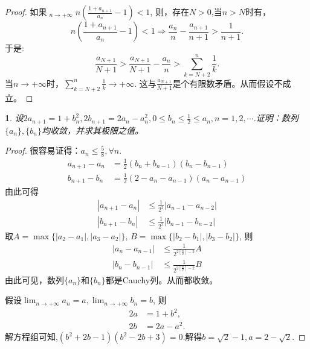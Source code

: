 \documentclass[utf8]{book}
\newtheorem{example}{}[section]             %
\DeclareMathOperator*\uplim{\overline{lim}}
\begin{document}
\begin{proof}
如果$\displaystyle\uplim_{n\to +\infty}n\left(\frac{1+a_{n+1}}{a_n}-1\right) < 1$, 
则，存在$N>0$,当$n>N$时有，
$$n\left(\frac{1+a_{n+1}}{a_n}-1\right) < 1\Rightarrow \frac{a_n}{n} - \frac{a_{n+1}}{n+1}>\frac{1}{n+1}.$$
于是:
$$\frac{a_{N+1}}{N+1} > \frac{a_{N+1}}{N+1} - \frac{a_n}{n} > \displaystyle\sum_{k=N+2}^n\frac{1}{k}.$$
当$n\to +\infty$时，$\displaystyle\sum_{k=N+2}^n\frac{1}{k}\to+\infty.$ 这与$\frac{a_{N+1}}{N+1}$是个有限数矛盾。从而假设不成立。
\end{proof}
\begin{example}
设$2a_{n+1}=1+b_n^2, 2b_{n+1}=2a_n-a_n^2, 0\leq b_n \leq \frac{1}{2}\leq a_n, n = 1,2,\cdots$.证明：数列$\{a_n\}, \{b_n\}$均收敛，并求其极限之值。
\end{example}
\begin{proof}
很容易证得：$a_n\leq \frac{5}{8},\forall n$. 
\begin{equation*}
\begin{split}
a_{n+1} - a_{n} &= \frac{1}{2}(b_n + b_{n-1})(b_n - b_{n-1})\\
b_{n+1} - b_n &= \frac{1}{2}\left(2-a_n-a_{n-1}\right)\left(a_n - a_{n-1}\right)
\end{split}
\end{equation*}
由此可得
\begin{equation*}
\begin{split}
\left|a_{n+1} - a_{n}\right| &\leq \frac{1}{2^2}\left|a_{n-1} - a_{n-2}\right|\\
\left|b_{n+1} - b_n\right| &\leq \frac{1}{2^2}\left|b_{n-1} - b_{n-2}\right|
\end{split}
\end{equation*}
取$A = \max\{\left|a_{2} - a_{1}\right|, \left|a_{3} - a_{2}\right|\}$, 
$B = \max\{\left|b_{2} - b_{1}\right|, \left|b_{3} - b_{2}\right|\}$, 则
\begin{equation*}
\begin{split}
\left|a_{n} - a_{n-1}\right| &\leq \frac{1}{2^{2[\frac{n}{2}]-2}}A\\
\left|b_{n} - b_{n-1}\right| &\leq \frac{1}{2^{2[\frac{n}{2}]-2}}B
\end{split}
\end{equation*}
由此可见，数列$\{a_n\}$和$\{b_n\}$都是Cauchy列。从而都收敛。

假设$\displaystyle\lim_{n\to +\infty}a_n = a, \displaystyle\lim_{n\to +\infty}b_n = b$, 则
\begin{equation*}
\begin{split}
2a&=1+b^2,\\
2b&=2a-a^2.
\end{split}
\end{equation*}
解方程组可知,$(b^2+2b-1)(b^2-2b+3)=0$.解得$b=\sqrt{2} - 1, a = 2-\sqrt{2}$.
\end{proof}
\end{document}
